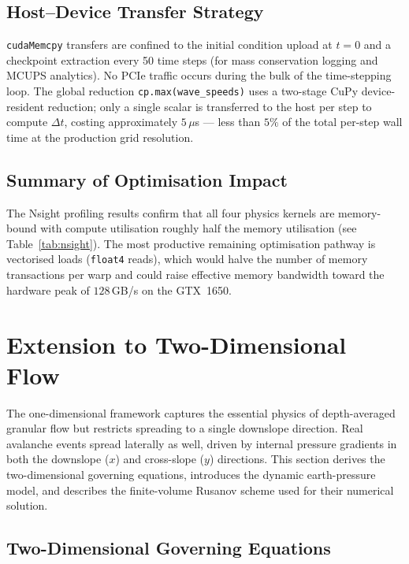 \documentclass[10pt, conference]{FMFP2023}
\begin{document}
\subsection{Host--Device Transfer Strategy}

\texttt{cudaMemcpy} transfers are confined to the initial
condition upload at $t=0$ and a checkpoint extraction every
50 time steps (for mass conservation logging and MCUPS
analytics).
No PCIe traffic occurs during the bulk of the time-stepping
loop.
The global reduction \texttt{cp.max(wave\_speeds)} uses a
two-stage CuPy device-resident reduction; only a single
scalar is transferred to the host per step to compute
$\Delta t$, costing approximately $5\,\mu$s --- less than
$5\%$ of the total per-step wall time at the production
grid resolution.

\subsection{Summary of Optimisation Impact}

The Nsight profiling results confirm that all four physics
kernels are memory-bound with compute utilisation
roughly half the memory utilisation (see
Table~\ref{tab:nsight}).
The most productive remaining optimisation pathway is
vectorised loads (\texttt{float4} reads), which would
halve the number of memory transactions per warp and
could raise effective memory bandwidth toward the
hardware peak of $128$\,GB/s on the GTX~1650.

\section{Extension to Two-Dimensional Flow}

The one-dimensional framework captures the essential physics of
depth-averaged granular flow but restricts spreading to a single
downslope direction.
Real avalanche events spread laterally as well, driven by internal
pressure gradients in both the downslope ($x$) and cross-slope ($y$)
directions.
This section derives the two-dimensional governing equations,
introduces the dynamic earth-pressure model, and describes the
finite-volume Rusanov scheme used for their numerical solution.

\subsection{Two-Dimensional Governing Equations}
\end{document}
